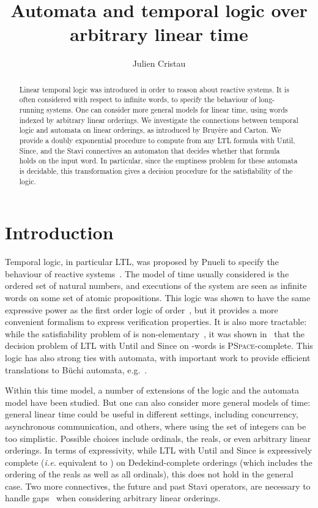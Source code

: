 \documentclass[envcountsame]{fsttcs-ps}
\newcommand{\until}{{Until}\xspace}
\newcommand{\since}{{Since}\xspace}
\newcommand{\ie}{\textit{i.e.}\xspace}
\newcommand{\pspace}{\textsc{PSpace}\xspace}
\begin{document}
\title{Automata and temporal logic over arbitrary linear time}
\author{Julien Cristau}


\begin{abstract}
Linear temporal logic was introduced in order to reason about reactive
systems.  It is often considered with respect to infinite words, to specify
the behaviour of long-running systems.  One can consider more general models
for linear time, using words indexed by arbitrary linear orderings.  We
investigate the connections between temporal logic and automata on linear
orderings, as introduced by Bruyère and Carton.  We provide a doubly
exponential procedure to compute from any LTL formula with \until, \since, and
the Stavi connectives an automaton that decides whether that formula holds on
the input word.  In particular, since the emptiness problem for these automata
is decidable, this transformation gives a decision procedure for the
satisfiability of the logic.
\end{abstract}

\section{Introduction}

Temporal logic, in particular LTL, was proposed by Pnueli to specify the
behaviour of reactive systems~\cite{DBLP:conf/focs/Pnueli77}.  The model of
time usually considered is the ordered set of natural numbers, and executions
of the system are seen as infinite words on some set of atomic propositions.
This logic was shown to have the same expressive power as the first order
logic of order~\cite{Kamp}, but it provides a more convenient formalism to express
verification properties.  It is also more tractable: while the satisfiability
problem of  is non-elementary~\cite{stockmeyer74}, it was shown
in~\cite{DBLP:journals/jacm/SistlaC85} that the decision problem of LTL with
\until and \since on -words is \pspace-complete.  This logic has also
strong ties with automata, with important work to provide efficient
translations to Büchi automata, e.g.~\cite{DBLP:conf/cav/GastinO01}.

Within this time model, a number of extensions of the logic and the automata
model have been studied.  But one can also consider more general models of
time: general linear time could be useful in different settings, including
concurrency, asynchronous communication, and others, where using the set of
integers can be too simplistic.  Possible choices include ordinals, the reals,
or even arbitrary linear orderings.  In terms of expressivity, while LTL with
\until and \since is expressively complete (\ie equivalent to ) on
Dedekind-complete orderings (which includes the ordering of the reals as
well as all ordinals), this does not hold in the general case.  Two more
connectives, the future and past Stavi operators, are necessary to handle
gaps~\cite{DBLP:conf/popl/GabbayPSS80} when considering arbitrary linear
orderings.
\end{document}
